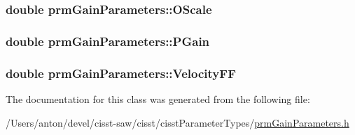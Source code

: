\subsubsection[{O\+Scale}]{\setlength{\rightskip}{0pt plus 5cm}double prm\+Gain\+Parameters\+::\+O\+Scale}\label{classprm_gain_parameters_ab99c3badf541dcb2ed494281917cd9df}
\hypertarget{classprm_gain_parameters_a60f5eb4771e850faf09e1adc277a9212}{}
\subsubsection[{P\+Gain}]{\setlength{\rightskip}{0pt plus 5cm}double prm\+Gain\+Parameters\+::\+P\+Gain}\label{classprm_gain_parameters_a60f5eb4771e850faf09e1adc277a9212}
\hypertarget{classprm_gain_parameters_a331e5f1371acaf30e54f13e0e243aa0a}{}
\subsubsection[{Velocity\+F\+F}]{\setlength{\rightskip}{0pt plus 5cm}double prm\+Gain\+Parameters\+::\+Velocity\+F\+F}\label{classprm_gain_parameters_a331e5f1371acaf30e54f13e0e243aa0a}


The documentation for this class was generated from the following file\+:\begin{DoxyCompactItemize}
\item 
/\+Users/anton/devel/cisst-\/saw/cisst/cisst\+Parameter\+Types/\hyperlink{prm_gain_parameters_8h}{prm\+Gain\+Parameters.\+h}\end{DoxyCompactItemize}
